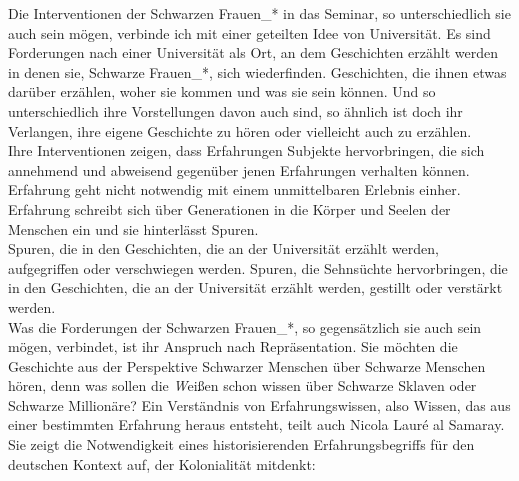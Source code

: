 \noindent Die Interventionen der Schwarzen Frauen\_* in das Seminar, so unterschiedlich sie
auch sein mögen, verbinde ich mit einer geteilten Idee von Universität. Es sind
Forderungen nach einer Universität als Ort, an dem Geschichten erzählt werden
in denen sie, Schwarze Frauen\_*, sich wiederfinden. Geschichten, die ihnen
etwas darüber erzählen, woher sie kommen und was sie sein können. Und so
unterschiedlich ihre Vorstellungen davon auch sind, so ähnlich ist doch ihr
Verlangen, ihre eigene Geschichte zu hören oder vielleicht auch zu erzählen.\\
Ihre Interventionen zeigen, dass Erfahrungen
Subjekte hervorbringen, die sich annehmend und abweisend gegenüber jenen
Erfahrungen verhalten können. Erfahrung geht nicht notwendig mit einem
unmittelbaren Erlebnis einher. Erfahrung schreibt sich über Generationen in die
Körper und Seelen der Menschen ein und sie hinterlässt Spuren.\\
Spuren, die in den Geschichten, die an der Universität erzählt werden,
aufgegriffen oder verschwiegen werden. Spuren, die Sehnsüchte hervorbringen,
die in den Geschichten, die an der Universität erzählt werden, gestillt oder
verstärkt werden.\\
Was die Forderungen der Schwarzen Frauen\_*, so gegensätzlich
sie auch sein mögen, verbindet, ist ihr Anspruch nach Repräsentation. Sie
möchten die Geschichte aus der Perspektive Schwarzer Menschen über Schwarze
Menschen hören, denn was sollen die \textit{W}eißen schon wissen über Schwarze Sklaven
oder Schwarze Millionäre?  Ein Verständnis von Erfahrungswissen, also Wissen,
das aus einer bestimmten Erfahrung heraus entsteht, teilt auch Nicola Lauré al
Samaray. Sie zeigt die Notwendigkeit eines historisierenden Erfahrungsbegriffs
für den deutschen Kontext auf, der Kolonialität mitdenkt:

